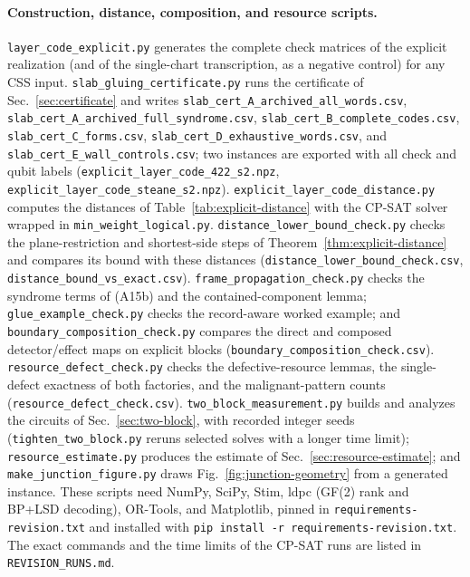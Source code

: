 \documentclass[aps,prx,reprint,superscriptaddress,nofootinbib,floatfix,longbibliography]{revtex4-2}
\theoremstyle{definition}
\begin{document}
\paragraph{Construction, distance, composition, and resource scripts.}
\texttt{layer\_code\_explicit.py} generates the complete check matrices of the
explicit realization (and of the single-chart transcription, as a negative
control) for any CSS input.  \texttt{slab\_gluing\_certificate.py} runs the
certificate of Sec.~\ref{sec:certificate} and writes
\nolinkurl{slab_cert_A_archived_all_words.csv},
\nolinkurl{slab_cert_A_archived_full_syndrome.csv},
\nolinkurl{slab_cert_B_complete_codes.csv}, \nolinkurl{slab_cert_C_forms.csv},
\nolinkurl{slab_cert_D_exhaustive_words.csv}, and
\nolinkurl{slab_cert_E_wall_controls.csv}; two instances are exported with all
check and qubit labels (\nolinkurl{explicit_layer_code_422_s2.npz},
\nolinkurl{explicit_layer_code_steane_s2.npz}).
\texttt{explicit\_layer\_code\_distance.py} computes the distances of
Table~\ref{tab:explicit-distance} with the CP-SAT solver wrapped in
\texttt{min\_weight\_logical.py}.  \texttt{distance\_lower\_bound\_check.py}
checks the plane-restriction and shortest-side steps of
Theorem~\ref{thm:explicit-distance} and compares its bound with these
distances (\nolinkurl{distance_lower_bound_check.csv},
\nolinkurl{distance_bound_vs_exact.csv}).  \texttt{frame\_propagation\_check.py}
checks the syndrome terms of (A15b) and the contained-component lemma;
\texttt{glue\_example\_check.py} checks the record-aware worked example; and
\texttt{boundary\_composition\_check.py} compares the direct and composed
detector/effect maps on explicit blocks
(\nolinkurl{boundary_composition_check.csv}).
\texttt{resource\_defect\_check.py} checks the defective-resource lemmas, the
single-defect exactness of both factories, and the malignant-pattern counts
(\nolinkurl{resource_defect_check.csv}).  \texttt{two\_block\_measurement.py}
builds and analyzes the circuits of Sec.~\ref{sec:two-block}, with recorded
integer seeds (\texttt{tighten\_two\_block.py} reruns selected solves with a
longer time limit); \texttt{resource\_estimate.py} produces the estimate of
Sec.~\ref{sec:resource-estimate}; and \texttt{make\_junction\_figure.py} draws
Fig.~\ref{fig:junction-geometry} from a generated instance.  These scripts need
NumPy, SciPy, Stim, ldpc (GF(2) rank and BP+LSD decoding), OR-Tools, and
Matplotlib, pinned in \nolinkurl{requirements-revision.txt} and installed with
\texttt{pip install -r requirements-revision.txt}.  The exact commands and the
time limits of the CP-SAT runs are listed in \nolinkurl{REVISION_RUNS.md}.
\end{document}
